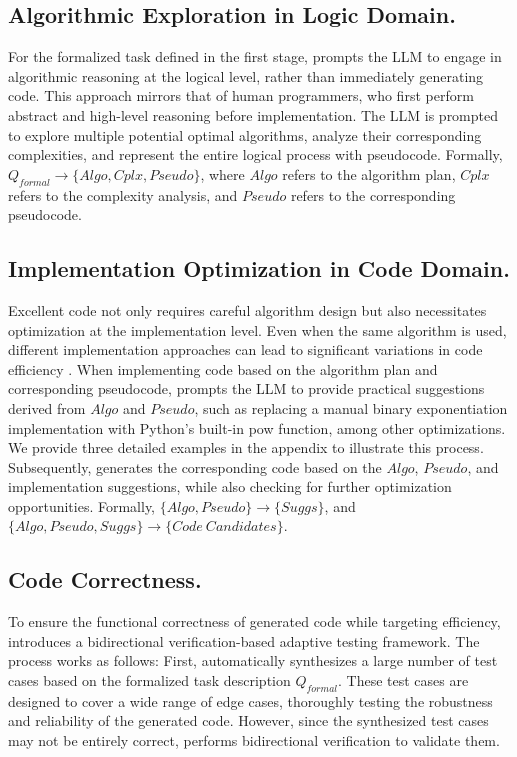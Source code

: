 \subsection{Algorithmic Exploration in Logic Domain.}
\label{method-2}
For the formalized task defined in the first stage, \tool prompts the LLM to engage in algorithmic reasoning at the logical level, rather than immediately generating code. This approach mirrors that of human programmers, who first perform abstract and high-level reasoning before implementation. The LLM is prompted to explore multiple potential optimal algorithms, analyze their corresponding complexities, and represent the entire logical process with pseudocode. Formally, $Q_{formal} \to \{Algo, Cplx, Pseudo\}$, where $Algo$ refers to the algorithm plan, $Cplx$ refers to the complexity analysis, and $Pseudo$ refers to the corresponding pseudocode.

\subsection{Implementation Optimization in Code Domain.}
\label{method-3}
Excellent code not only requires careful algorithm design but also necessitates optimization at the implementation level. Even when the same algorithm is used, different implementation approaches can lead to significant variations in code efficiency \cite{shypula2024learning, Coignion_2024}. When implementing code based on the algorithm plan and corresponding pseudocode, \tool prompts the LLM to provide practical suggestions derived from $Algo$ and $Pseudo$, such as replacing a manual binary exponentiation implementation with Python’s built-in pow function, among other optimizations. We provide three detailed examples in the appendix to illustrate this process. Subsequently, \tool generates the corresponding code based on the $Algo$, $Pseudo$, and implementation suggestions, while also checking for further optimization opportunities. Formally, 
$\{Algo, Pseudo\}\to\{Suggs\}$, and $\{Algo, Pseudo, Suggs\}\to\{Code \ Candidates\}$.



\subsection{Code Correctness.}
\label{method-4}
To ensure the functional correctness of generated code while targeting efficiency, \tool introduces a bidirectional verification-based adaptive testing framework. The process works as follows: First, \tool automatically synthesizes a large number of test cases based on the formalized task description $Q_{formal}$. These test cases are designed to cover a wide range of edge cases, thoroughly testing the robustness and reliability of the generated code. However, since the synthesized test cases may not be entirely correct, \tool performs bidirectional verification to validate them.

